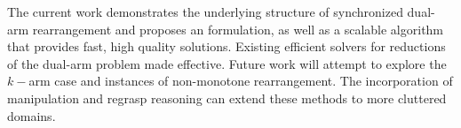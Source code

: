 The current work demonstrates the underlying structure of synchronized dual-arm rearrangement and proposes an \milp formulation, as well as a scalable algorithm \algo that provides fast, high quality solutions. Existing efficient solvers for reductions of the dual-arm problem made \algo effective. Future work will attempt to explore the $k-$arm case and instances of non-monotone rearrangement. The incorporation of manipulation and regrasp reasoning can extend these methods to more cluttered domains. 


